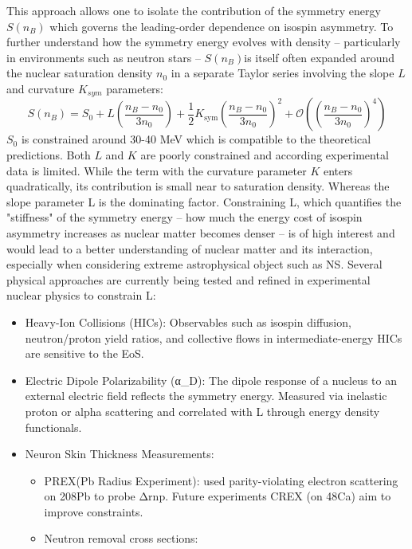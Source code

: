 This approach allows one to isolate the contribution of the symmetry energy $S(n_B)$  which governs the leading-order dependence on isospin asymmetry.\newline
To further understand how the symmetry energy evolves with density -- particularly in environments such as neutron stars -- $S(n_B) $is itself often expanded around the nuclear saturation density $n_0$ in a separate Taylor series involving the slope $L$ and curvature $K_{sym}$ parameters:
\begin{equation}
S(n_B) = S_0 + L \left( \frac{n_B - n_0}{3n_0} \right) + \frac{1}{2} K_{\text{sym}} \left( \frac{n_B - n_0}{3n_0} \right)^2 + \mathcal{O}\left(\left( \frac{n_B - n_0}{3n_0}\right)^4 \right)
\end{equation}
$S_0$ is constrained around 30-40 MeV which is compatible to the theoretical predictions. Both $L$ and $K$ are poorly constrained and according experimental data is limited. While the term with the curvature parameter $K$ enters quadratically, its contribution is small near to saturation density.\newline
Whereas the slope parameter L is the dominating factor. Constraining L, which quantifies the "stiffness" of the symmetry energy -- how much the energy cost of isospin asymmetry increases as nuclear matter becomes denser -- is of high interest and would lead to a better understanding of nuclear matter and its interaction, especially when considering extreme astrophysical object such as NS.\newline
Several physical approaches are currently being tested and refined in experimental nuclear physics to constrain L:
\begin{itemize}
\item Heavy-Ion Collisions (HICs):
	Observables such as isospin diffusion, neutron/proton yield ratios, and collective flows in intermediate-energy HICs are sensitive to the EoS.
\item Electric Dipole Polarizability (α_D):
	The dipole response of a nucleus to an external electric field reflects the symmetry energy.
Measured via inelastic proton or alpha scattering and correlated with L through energy density functionals.
\item Neuron Skin Thickness Measurements:
\begin{itemize}
\item PREX(Pb Radius Experiment): used parity-violating electron scattering on 208Pb to probe Δrnp​.
Future experiments CREX (on 48Ca) aim to improve constraints.
\item Neutron removal cross sections: 
\end{itemize}
\end{itemize}

